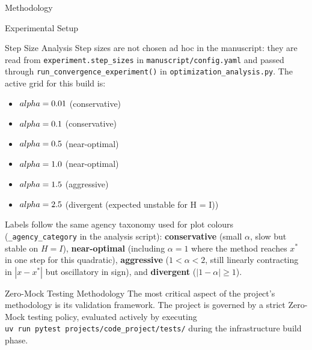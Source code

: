 \documentclass[
  ignorenonframetext,
]{beamer}
\providecommand{\tightlist}{%
  \setlength{\itemsep}{0pt}\setlength{\parskip}{0pt}}
\begin{document}
\begin{frame}[fragile]{Methodology}
\begin{block}{Experimental Setup}
\protect{}\label{experimental-setup}
\begin{block}{Step Size Analysis}
\protect{}\label{step-size-analysis}
Step sizes are not chosen ad hoc in the manuscript: they are read from
\texttt{experiment.step\_sizes} in \texttt{manuscript/config.yaml} and
passed through \texttt{run\_convergence\_experiment()} in
\texttt{optimization\_analysis.py}. The active grid for this build is:

\begin{itemize}
\tightlist
\item
  \(\\alpha = 0.01\) (conservative)
\item
  \(\\alpha = 0.1\) (conservative)
\item
  \(\\alpha = 0.5\) (near-optimal)
\item
  \(\\alpha = 1.0\) (near-optimal)
\item
  \(\\alpha = 1.5\) (aggressive)
\item
  \(\\alpha = 2.5\) (divergent (expected unstable for H = I))
\end{itemize}

Labels follow the same agency taxonomy used for plot colours
(\texttt{\_agency\_category} in the analysis script):
\textbf{conservative} (small \(\alpha\), slow but stable on \(H=I\)),
\textbf{near-optimal} (including \(\alpha=1\) where the method reaches
\(x^\ast\) in one step for this quadratic), \textbf{aggressive}
(\(1 < \alpha < 2\), still linearly contracting in \(|x-x^\ast|\) but
oscillatory in sign), and \textbf{divergent} (\(|1-\alpha| \geq 1\)).
\end{block}

\begin{block}{Zero-Mock Testing Methodology}
\protect{}\label{zero-mock-testing-methodology}
The most critical aspect of the project's methodology is its validation
framework. The project is governed by a strict Zero-Mock testing policy,
evaluated actively by executing
\texttt{uv\ run\ pytest\ projects/code\_project/tests/} during the
infrastructure build phase.


\end{block}
\end{block}
\end{frame}
\end{document}
